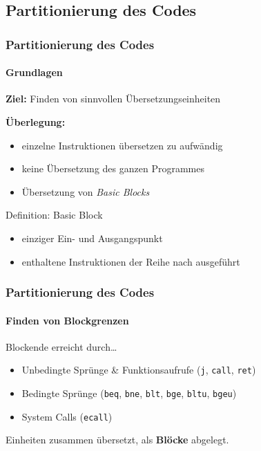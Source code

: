\subsection{Partitionierung des Codes} %
\begin{frame}
	\frametitle{Partitionierung des Codes}
	\framesubtitle{Grundlagen}
	\textbf{Ziel:} Finden von sinnvollen Übersetzungseinheiten
	
	\vspace{0.50cm}
	
	\pause
	\textbf{Überlegung:}
	\begin{itemize}
		\item einzelne Instruktionen übersetzen zu aufwändig
		\item keine Übersetzung des ganzen Programmes
		\item[\conclude] Übersetzung von \textit{Basic Blocks}
	\end{itemize}
	
	\vspace{0.50cm}
	
	\pause
	\begin{block}{Definition: Basic Block}
		\begin{itemize}
			\item einziger Ein- und Ausgangspunkt
			\item enthaltene Instruktionen der Reihe nach ausgeführt
		\end{itemize}
	\end{block}
\end{frame}

\begin{frame}
	\frametitle{Partitionierung des Codes}
	\framesubtitle{Finden von Blockgrenzen}
	
	\begin{block}{Blockende erreicht durch\ldots}
		\begin{itemize}
			\item Unbedingte Sprünge \& Funktionsaufrufe (\texttt{j}, \texttt{call}, \texttt{ret})
			\item Bedingte Sprünge (\texttt{beq}, \texttt{bne}, \texttt{blt}, \texttt{bge}, \texttt{bltu}, \texttt{bgeu})
			\item System Calls (\texttt{ecall})
		\end{itemize}
	\end{block}
	
	\vspace{0.50cm}
	
	Einheiten zusammen übersetzt, als \textbf{Blöcke} abgelegt.
	
\end{frame}

